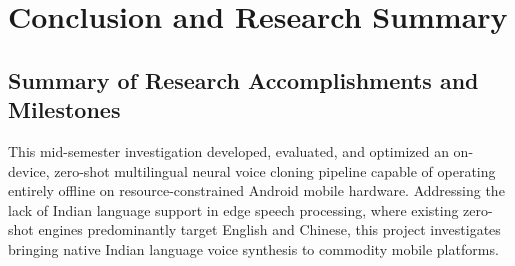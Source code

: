 \chapter{Conclusion and Research Summary}
\label{Chapter6}

\section{Summary of Research Accomplishments and Milestones}
This mid-semester investigation developed, evaluated, and optimized an on-device, zero-shot multilingual neural voice cloning pipeline capable of operating entirely offline on resource-constrained Android mobile hardware. Addressing the lack of Indian language support in edge speech processing, where existing zero-shot engines predominantly target English and Chinese, this project investigates bringing native Indian language voice synthesis to commodity mobile platforms.

